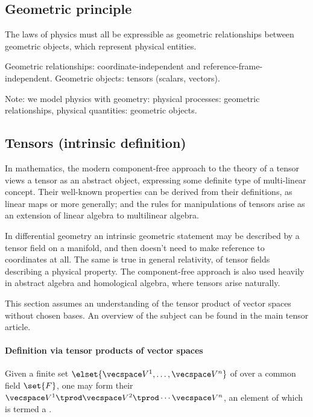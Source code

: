 \subsection{Geometric principle}

The laws of physics must all be expressible as geometric relationships between geometric objects, which represent physical entities.

Geometric relationships: coordinate-independent and reference-frame-independent. Geometric objects: tensors (scalars, vectors).

Note: we model physics with geometry: physical processes: geometric relationships, physical quantities: geometric objects.


\subsection{Tensors (intrinsic definition)}

In mathematics, the modern component-free approach to the theory of a tensor views a tensor as an abstract object, expressing some definite type of multi-linear concept. Their well-known properties can be derived from their definitions, as linear maps or more generally; and the rules for manipulations of tensors arise as an extension of linear algebra to multilinear algebra.

In differential geometry an intrinsic geometric statement may be described by a tensor field on a manifold, and then doesn't need to make reference to coordinates at all. The same is true in general relativity, of tensor fields describing a physical property. The component-free approach is also used heavily in abstract algebra and homological algebra, where tensors arise naturally.

\begin{note}
  This section assumes an understanding of the tensor product of vector spaces without chosen bases. An overview of the subject can be found in the main tensor article.
\end{note}

\paragraph{Definition via tensor products of vector spaces} Given a finite set $\elset{\vecspace V^1, \dotsc, \vecspace V^n}$ of  over a common field $\set{F}$, one may form their  $\vecspace V^1\tprod\vecspace V^2\tprod\dotsb\vecspace V^n$, an element of which is termed a .

